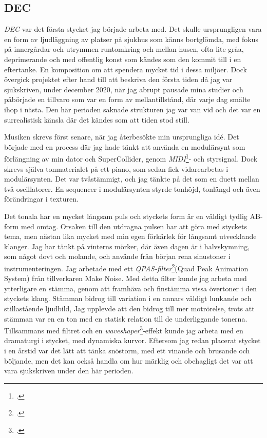 \documentclass{article}
\begin{document}
\subsection{DEC}\nocite{DEC}
\emph{DEC} var det första stycket jag började arbeta med. Det skulle ursprungligen vara en form av ljudläggning
av platser på sjukhus som känns bortglömda, med fokus på innergårdar och utrymmen runtomkring och mellan
husen, ofta lite gråa, deprimerande och med offentlig konst som kändes som den kommit till i en eftertanke. En
komposition om att spendera mycket tid i dessa miljöer. Dock övergick projektet efter hand till att beskriva
den första tiden då jag var sjukskriven, under december 2020, när jag abrupt pausade mina studier
och påbörjade en tillvaro som var en form av mellantillstånd, där varje dag smälte ihop i nästa. Den här
perioden saknade strukturen jag var van vid och det var en surrealistisk känsla där det kändes som att tiden
stod still.

Musiken skrevs först senare, när jag återbesökte min ursprungliga idé. Det började med en process där jag hade
tänkt att använda en modulärsynt som förlängning av min dator och SuperCollider, genom
\emph{MIDI}\footcite{midi}- och styrsignal. 
Dock skrevs själva tonmaterialet på ett piano, som sedan fick vidarearbetas i modulärsynten. Det var
tvåstämmigt, och jag tänkte på det som en duett mellan två oscillatorer. En sequencer i modulärsynten styrde 
tonhöjd, tonlängd och även förändringar i texturen. 

Det tonala har en mycket långsam puls och styckets form är en väldigt tydlig AB-form med omtag. Orsaken till
den utdragna pulsen har att göra med styckets tema, men nästan lika mycket med min egen förkärlek för långsamt
utvecklande klanger. Jag har tänkt på vinterns mörker, där även dagen är i halvskymning, som något dovt och
molande, och använde från början rena sinustoner i instrumenteringen. Jag arbetade med ett
\emph{QPAS-filter}\footcite{qpas}(Quad Peak Animation System) från
tillverkaren Make Noise. Med detta filter kunde jag arbeta med ytterligare en stämma, genom att framhäva och
finstämma vissa övertoner i den styckets klang. Stämman bidrog till variation i en annars väldigt lunkande och
stillastående ljudbild, Jag upplevde att den bidrog till mer motrörelse, trots att stämman var en en ton med
en statisk relation till de underliggande tonerna. Tillsammans med filtret och en
\emph{waveshaper}\footcite{waveshaper}-effekt kunde jag arbeta med en dramaturgi i
stycket, med dynamiska kurvor. Eftersom jag redan placerat stycket i en årstid var det lätt att tänka
snöstorm, med ett vinande och brusande och böljande, men det kan också handla om hur märklig och obehagligt
det var att vara sjukskriven under den här perioden.
\end{document}
